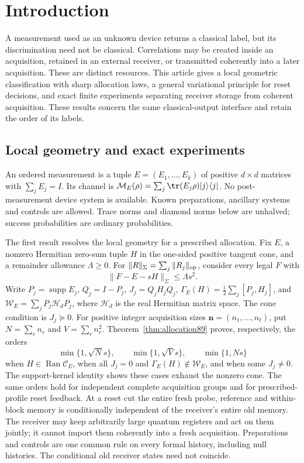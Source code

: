 \section{Introduction}\label{sec:introduction84}
A measurement used as an unknown device returns a classical label, but
its discrimination need not be classical.  Correlations may be created
inside an acquisition, retained in an external receiver, or transmitted
coherently into a later acquisition.  These are distinct resources.
This article gives a local geometric classification with sharp allocation
laws, a general variational principle for reset decisions, and exact
finite experiments separating receiver storage from coherent acquisition.  These results concern the same classical-output
interface and retain the order of its labels.

\subsection{Local geometry and exact experiments}
An ordered measurement is a tuple $E=(E_1,\ldots,E_k)$ of positive
$d\times d$ matrices with $\sum_jE_j=I$.  Its channel is
$\mathcal M_E(\rho)=\sum_j\tr(E_j\rho)|j\rangle\langle j|$.
No post-measurement device system is available.  Known preparations,
ancillary systems and controls are allowed.  Trace norms and diamond
norms below are unhalved; success probabilities are ordinary probabilities.

The first result resolves the local geometry for a prescribed allocation.
Fix $E$, a nonzero Hermitian zero-sum tuple $H$ in the one-sided positive
tangent cone, and a remainder allowance $\Lambda\ge0$.  For
$\|R\|_\Sigma=\sum_j\|R_j\|_{\rm op}$, consider every legal $F$ with
\begin{equation}\label{eq:fronttube87}
 \|F-E-sH\|_\Sigma\le\Lambda s^2.
\end{equation}
Write $P_j=\operatorname{supp}E_j$, $Q_j=I-P_j$,
$J_j=Q_jH_jQ_j$, $\Gamma_E(H)=\frac i2\sum_j[P_j,H_j]$, and
$\mathcal W_E=\sum_jP_j\mathcal H_dP_j$, where $\mathcal H_d$ is the
real Hermitian matrix space.  The cone condition is $J_j\succeq0$.
For positive integer acquisition sizes $\boldsymbol n=(n_1,\ldots,n_\ell)$,
put $N=\sum_rn_r$ and $V=\sum_rn_r^2$.
Theorem~\ref{thm:allocation89} proves, respectively, the orders
\begin{equation}\label{eq:frontprofile89}
 \min\{1,\sqrt N s\},\qquad \min\{1,\sqrt V s\},\qquad \min\{1,Ns\}
\end{equation}
when $H\in\operatorname{Ran}\mathcal C_E$, when all $J_j=0$ and
$\Gamma_E(H)\notin\mathcal W_E$, and when some $J_j\ne0$.
The support-kernel identity shows these cases exhaust the nonzero cone.
The same orders hold for independent complete acquisition groups and
for prescribed-profile reset feedback.  At a reset cut the entire fresh
probe, reference and within-block memory is conditionally independent
of the receiver's entire old memory.  The receiver may keep arbitrarily
large quantum registers and act on them jointly; it cannot import them
coherently into a fresh acquisition.  Preparations and controls are one
common rule on every formal history, including null histories.  The
conditional old receiver states need not coincide.

